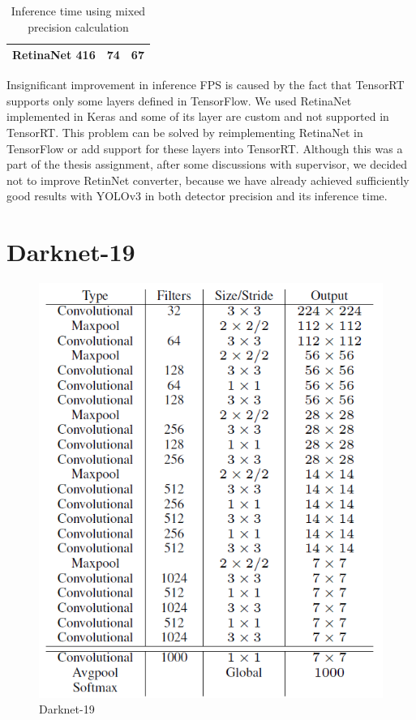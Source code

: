 \documentclass[twoside]{ctuthesis}
\theoremstyle{plain}
\theoremstyle{definition}
\theoremstyle{note}
\begin{document}
\begin{table}[hbt]
\begin{tabular}{|c|c|c|}
RetinaNet 416                                            & 74                                                                                                                            & 67                                                                                                                                  \\ \hline
\end{tabular}
\caption{Inference time using mixed precision calculation}
\label{inference_time_mixed}
\end{table}
Insignificant improvement in inference FPS is caused by the fact that TensorRT supports only some layers defined in TensorFlow. We used RetinaNet implemented in Keras and some of its layer are custom and not supported in TensorRT. This problem can be solved by reimplementing RetinaNet in TensorFlow or add support for these layers into TensorRT.  Although this was a part of the thesis assignment, after some discussions with supervisor, we decided not to improve RetinNet converter, because we have already achieved sufficiently good results with YOLOv3 in both detector precision and its inference time.
                                                                                        
                                                                                
        
\appendix
\chapter{Darknet-19}
\label{darknet-19}
\begin{figure}[H]
\caption{Darknet-19}
\includegraphics[width=.9\textwidth]{images/used_networks/yolov2_darknet.png}
\end{figure}
\end{document}
